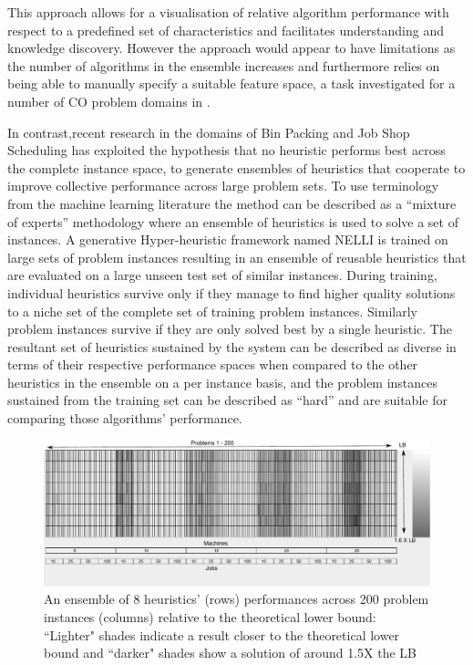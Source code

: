 \documentclass[a4paper]{article}
\begin{document}
This approach allows for a visualisation of relative algorithm performance with respect to a predefined set of characteristics and facilitates understanding and knowledge discovery. However the approach would appear to have limitations as the number of algorithms in the ensemble increases and furthermore relies on being able to manually specify a suitable feature space, a task investigated for a number of CO problem domains in \cite{Smith-Miles219}.

In contrast,recent research in the domains of Bin Packing and Job Shop Scheduling \citep{Sim2013ecj,Sim2015GECCO,Hart2015underReview} has exploited the hypothesis that no heuristic performs best across the complete instance space, to generate ensembles of heuristics that cooperate to improve collective performance across large problem sets. To use terminology from the machine learning literature the method can be described as a ``mixture of experts'' methodology where an ensemble of heuristics is used to solve a set of instances. A generative Hyper-heuristic framework named NELLI is trained on large sets of problem instances resulting in an ensemble of reusable heuristics that are evaluated on a large unseen test set of similar instances. 
During training, individual heuristics survive only if they manage to find higher quality solutions to a niche set of the complete set of training problem instances. 
Similarly problem instances survive if they are only solved best by a single heuristic. 
The resultant set of heuristics sustained by the system can be described as diverse in terms of their respective performance spaces when compared to the other heuristics in the ensemble on a per instance basis, and the problem instances sustained from the training set can be described as ``hard'' and are suitable for comparing those algorithms' performance.

\begin{figure}
\centering
\includegraphics[width=1.0\textwidth]{img/8HProfileBounds}
\caption{\label{img:lb}  An ensemble of 8 heuristics' (rows) performances across 200 problem instances (columns) relative to the theoretical lower bound: ``Lighter" shades indicate a result closer to the theoretical lower bound and ``darker" shades show a solution of around 1.5X the LB}
\end{figure} 
\end{document}
